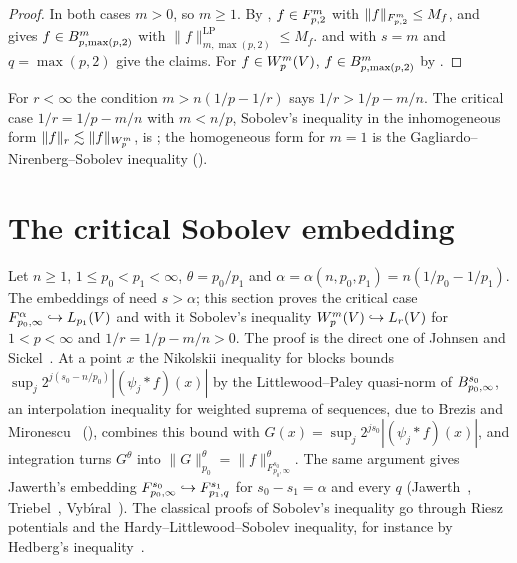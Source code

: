 \begin{proof}
\leanok
In both cases $m > 0$, so $m \geq 1$. By ,
$f \in F^{m}_{p,2}$ with $\|f\|_{F^{m}_{p,2}} \leq M_f$, and  gives
$f \in B^{m}_{p,\max(p,2)}$ with $\|f\|^{\mathrm{LP}}_{m,\max(p,2)} \leq M_f$.
 and  with $s = m$
and $q = \max(p, 2)$ give the claims. For $f \in W^{m}_{p}(V)$,
$f \in B^{m}_{p,\max(p,2)}$ by .
\end{proof}

For $r < \infty$ the condition $m > n(1/p - 1/r)$ says $1/r > 1/p - m/n$. The critical case
$1/r = 1/p - m/n$ with $m < n/p$, Sobolev's inequality in the inhomogeneous form
$\|f\|_{r} \lesssim \|f\|_{W^{m}_{p}}$, is ; the homogeneous
form for $m = 1$ is the Gagliardo--Nirenberg--Sobolev inequality
().

\section{The critical Sobolev embedding}
\label{sec:critical-sobolev-embedding}

Let $n \geq 1$, $1 \leq p_0 < p_1 < \infty$, $\theta = p_0/p_1$ and
$\alpha = \alpha(n, p_0, p_1) = n(1/p_0 - 1/p_1)$. The embeddings of
 need $s > \alpha$; this section proves the critical case
$F^{\alpha}_{p_0,\infty} \hookrightarrow L_{p_1}(V)$ and with it Sobolev's inequality
$W^{m}_{p}(V) \hookrightarrow L_r(V)$ for $1 < p < \infty$ and $1/r = 1/p - m/n > 0$. The proof is
the direct one of Johnsen and Sickel~\cite[Proposition~1]{JohnsenSickel2007}. At a point $x$ the
Nikolskii inequality for blocks bounds $\sup_j 2^{j(s_0 - n/p_0)} |(\psi_j * f)(x)|$ by the
Littlewood--Paley quasi-norm of $B^{s_0}_{p_0,\infty}$, an interpolation inequality for
weighted suprema of sequences, due to Brezis and Mironescu~\cite{BrezisMironescu2001}
(), combines this bound with
$G(x) = \sup_j 2^{j s_0} |(\psi_j * f)(x)|$, and integration turns $G^\theta$ into
$\|G\|_{p_0}^\theta = \|f\|_{F^{s_0}_{p_0,\infty}}^\theta$. The same argument gives Jawerth's
embedding $F^{s_0}_{p_0,\infty} \hookrightarrow F^{s_1}_{p_1,q}$ for
$s_0 - s_1 = \alpha$ and every $q$ (Jawerth~\cite{Jawerth1977}, Triebel~\cite[\S 2.7.1]{Triebel},
Vyb\'{\i}ral~\cite[Theorem~0.1~(ii)]{VybiralJF2008}). The classical proofs of Sobolev's inequality
go through Riesz potentials and the Hardy--Littlewood--Sobolev inequality, for instance by
Hedberg's inequality~\cite{Hedberg1972}.

